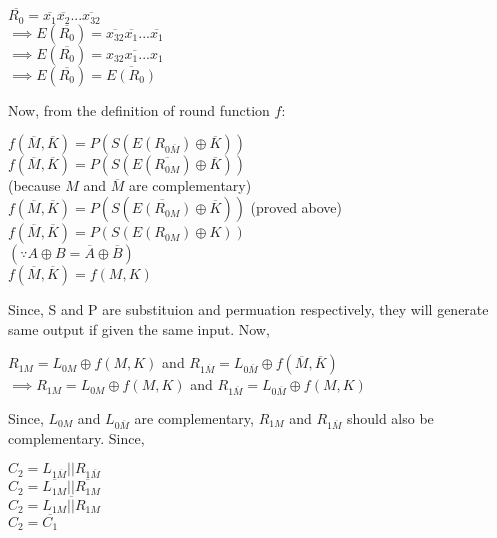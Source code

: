 \documentclass[11pt]{article}
\begin{document}
\begin{center}
    $\overline{R_0} = \overline{x_1} \overline{x_2}...\overline{x_{32}}$\\
    $\implies E(\overline{R_0}) = \overline{x_{32}}\overline{x_1}...\overline{x_1}$\\
    $\implies E(\overline{R_0}) = \overline{x_{32}x_{1}...x_1}$\\
    $\implies E(\overline{R_0}) = \overline{E(R_0)}$
\end{center}
Now, from the definition of round function $f$:
\begin{center}
    $f(\overline{M}, \overline{K}) = P(S(E({R_{0\overline{M}}}) \oplus \overline{K}))$\\
    \vspace{2mm}
    $f(\overline{M}, \overline{K}) = P(S(E({\overline{R_{0M}}}) \oplus \overline{K}))$\\
    \hfill (because $M$ and $\overline{M}$ are complementary)\\
    $f(\overline{M}, \overline{K}) = P(S(\overline{E(R_{0M})} \oplus \overline{K}))$ (proved above)\\
    \vspace{2mm}
    $f(\overline{M}, \overline{K}) = P(S({E(R_{0M})} \oplus {K}))$\\
    \hfill $(\because A \oplus B = \overline{A} \oplus \overline{B})$\\
    $f(\overline{M}, \overline{K}) = f(M, K)$\\
\end{center}
Since, S and P are substituion and permuation respectively, they will generate same output if given the same input. Now, 
\begin{center}
    $R_{1M} = L_{0M} \oplus f(M, K)$ and $R_{1\overline{M}} = L_{0\overline{M}} \oplus f(\overline{M}, \overline{K})$\\
    \vspace{2mm}
    $\implies R_{1M} = L_{0M} \oplus f(M, K)$ and $R_{1\overline{M}} = L_{0\overline{M}} \oplus f(M,K)$\\
\end{center}
Since, $L_{0M}$ and $L_{0\overline{M}}$ are complementary, $R_{1M}$ and $R_{1\overline{M}}$ should also be complementary. Since, 
\begin{center}
    $C_2 = L_{1\overline{M}} || R_{1\overline{M}}$\\
    \vspace{2mm}
    $C_2 = \overline{L_{1M}} || \overline{R_{1M}}$\\
    \vspace{2mm}
    $C_2 = \overline{L_{1M} || R_{1M}}$\\
    \vspace{2mm}
    $C_2 = \overline{C_1}$
\end{center}
\end{document}
